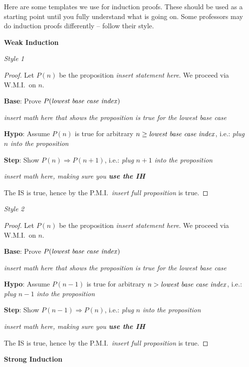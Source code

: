 \documentclass[main.tex]{subfiles}
\begin{document}
Here are some templates we use for induction proofs. These should be used as a starting point until you fully understand what is going on. Some professors may do induction proofs differently -- follow their style.

\textbf{Weak Induction}

\textit{Style 1}
\begin{proof}
	Let \(P(n)\) be the proposition \textit{insert statement here}. We proceed via W.M.I.\ on \(n\).
	
	\textbf{Base}: Prove \(P(\text{\textit{lowest base case index}})\)
	
	\textit{insert math here that shows the proposition is true for the lowest base case}
	
	\textbf{Hypo}: Assume \(P(n)\) is true for arbitrary \(n \geq \text{\textit{lowest base case index}}\), i.e.: \textit{plug \(n\) into the proposition}
	
	\textbf{Step}: Show \(P(n) \Rightarrow P(n+1)\), i.e.: \textit{plug \(n+1\) into the proposition}
	
	\textit{insert math here, making sure you \textbf{use the IH}}
	
	The IS is true, hence by the P.M.I.\ \textit{insert full proposition} is true.
\end{proof}

\textit{Style 2}
\begin{proof}
	Let \(P(n)\) be the proposition \textit{insert statement here}. We proceed via W.M.I.\ on \(n\).
	
	\textbf{Base}: Prove \(P(\text{\textit{lowest base case index}})\)
	
	\textit{insert math here that shows the proposition is true for the lowest base case}
	
	\textbf{Hypo}: Assume \(P(n-1)\) is true for arbitrary \(n > \text{\textit{lowest base case index}}\), i.e.: \textit{plug \(n-1\) into the proposition}
	
	\textbf{Step}: Show \(P(n-1) \Rightarrow P(n)\), i.e.: \textit{plug \(n\) into the proposition}
	
	\textit{insert math here, making sure you \textbf{use the IH}}
	
	The IS is true, hence by the P.M.I.\ \textit{insert full proposition} is true.
\end{proof}

\textbf{Strong Induction}
\end{document}
